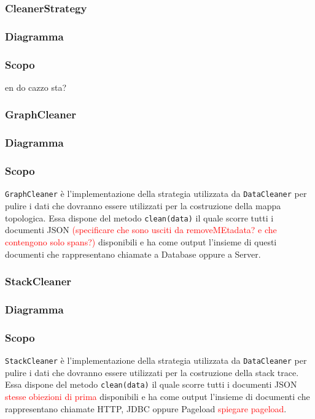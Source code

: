 \subsubsection{CleanerStrategy}
\label{sec:CleanerStrategy}
	\subsubsection{Diagramma}

	\subsubsection{Scopo}
	en do cazzo sta?
	
	
\subsubsection{GraphCleaner}
\label{sec:GraphCleaner}
	\subsubsection{Diagramma}

	\subsubsection{Scopo}
	\texttt{GraphCleaner} è l'implementazione della strategia utilizzata da \texttt{DataCleaner} per pulire i dati che dovranno essere utilizzati per la costruzione della mappa topologica. Essa dispone del metodo \texttt{clean(data)} il quale scorre tutti i documenti JSON \textcolor{red}{(specificare che sono usciti da removeMEtadata? e che contengono solo spans?)} disponibili e ha come output l'insieme di questi documenti che rappresentano chiamate a Database oppure a Server.
	
\subsubsection{StackCleaner}
\label{sec:StackCleaner}
	\subsubsection{Diagramma}
	
	\subsubsection{Scopo}
	\texttt{StackCleaner} è l'implementazione della strategia utilizzata da \texttt{DataCleaner} per pulire i dati che dovranno essere utilizzati per la costruzione della stack trace. Essa dispone del metodo \texttt{clean(data)} il quale scorre tutti i documenti JSON \textcolor{red}{stesse obiezioni di prima} disponibili e ha come output l'insieme di documenti che rappresentano chiamate HTTP, JDBC oppure Pageload \textcolor{red}{spiegare pageload}.
	

